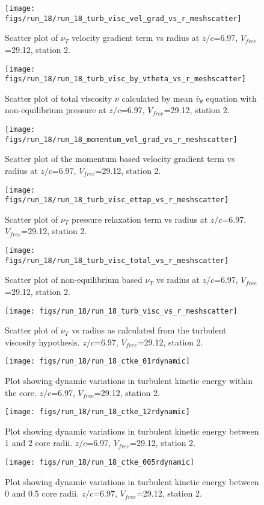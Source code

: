 \begin{figure}[H]
\centering
\texttt{[image: figs/run\_18/run\_18\_turb\_visc\_vel\_grad\_vs\_r\_meshscatter]}
\caption{Scatter plot of $\nu_T$ velocity gradient term vs radius at $z/c$=6.97, $V_{free}$=29.12, station 2.}
\end{figure}


\begin{figure}[H]
\centering
\texttt{[image: figs/run\_18/run\_18\_turb\_visc\_by\_vtheta\_vs\_r\_meshscatter]}
\caption{Scatter plot of total viscosity $\nu$ calculated by mean $\bar{v}_{\theta}$ equation with non-equilibrium pressure at $z/c$=6.97, $V_{free}$=29.12, station 2.}
\end{figure}


\begin{figure}[H]
\centering
\texttt{[image: figs/run\_18/run\_18\_momentum\_vel\_grad\_vs\_r\_meshscatter]}
\caption{Scatter plot of the momentum based velocity gradient term vs radius at $z/c$=6.97, $V_{free}$=29.12, station 2.}
\end{figure}


\begin{figure}[H]
\centering
\texttt{[image: figs/run\_18/run\_18\_turb\_visc\_ettap\_vs\_r\_meshscatter]}
\caption{Scatter plot of $\nu_T$ pressure relaxation term vs radius at $z/c$=6.97, $V_{free}$=29.12, station 2.}
\end{figure}


\begin{figure}[H]
\centering
\texttt{[image: figs/run\_18/run\_18\_turb\_visc\_total\_vs\_r\_meshscatter]}
\caption{Scatter plot of non-equilibrium based $\nu_T$ vs radius at $z/c$=6.97, $V_{free}$=29.12, station 2.}
\end{figure}


\begin{figure}[H]
\centering
\texttt{[image: figs/run\_18/run\_18\_turb\_visc\_vs\_r\_meshscatter]}
\caption{Scatter plot of $\nu_T$ vs radius as calculated from the turbulent viscosity hypothesis. $z/c$=6.97, $V_{free}$=29.12, station 2.}
\end{figure}


\begin{figure}[H]
\centering
\texttt{[image: figs/run\_18/run\_18\_ctke\_01rdynamic]}
\caption{Plot showing dynamic variations in turbulent kinetic energy within the core. $z/c$=6.97, $V_{free}$=29.12, station 2.}
\end{figure}


\begin{figure}[H]
\centering
\texttt{[image: figs/run\_18/run\_18\_ctke\_12rdynamic]}
\caption{Plot showing dynamic variations in turbulent kinetic energy between 1 and 2 core radii. $z/c$=6.97, $V_{free}$=29.12, station 2.}
\end{figure}


\begin{figure}[H]
\centering
\texttt{[image: figs/run\_18/run\_18\_ctke\_005rdynamic]}
\caption{Plot showing dynamic variations in turbulent kinetic energy between 0 and 0.5 core radii. $z/c$=6.97, $V_{free}$=29.12, station 2.}
\end{figure}



